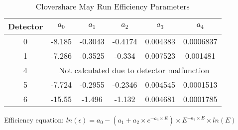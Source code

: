 \begin{table}[]
    \centering
    \caption{Clovershare May Run Efficiency Parameters}
    \label{tab:clover_may_eff}
    \begin{threeparttable}
    \begin{tabular}{c|c|c|c|c|c}
        \toprule
        Detector & $a_0$ & $a_1$ & $a_2$ & $a_3$ & $a_4$ \\
        \hline
        0	&	-8.185	&	-0.3043	&	-0.4174	&	0.004383	&	0.0006837	\\
        1	&	-7.286	&	-0.3525	&	-0.334	&	0.007523	&	0.001481	\\
        4	&	\multicolumn{5}{|c}{Not calculated due to detector malfunction}	\\
        5	&	-7.724	&	-0.2955	&	-0.2346	&	0.004545	&	0.0001513	\\
        6	&	-15.55	&	-1.496	&	-1.132	&	0.004681	&	0.0001785	\\
        \bottomrule
    \end{tabular}
    \begin{tablenotes}[para]
        Efficiency equation: $ln(\epsilon) = a_0-(a_1+a_2\times e^{-a_3\times E})\times E^{-a_4\times E}\times ln(E)$
    \end{tablenotes}
\end{threeparttable}
\end{table}
